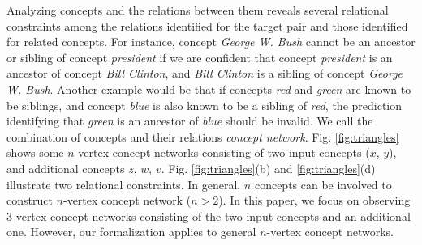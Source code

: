 
Analyzing concepts and the relations between them reveals several
relational constraints among the relations identified for the target
pair and those identified for related concepts. For instance, concept
{\em George W. Bush} cannot be an ancestor or sibling of concept {\em
  president} if we are confident that concept {\em president} is an
ancestor of concept {\em Bill Clinton}, and {\em Bill Clinton} is a
sibling of concept {\em George W. Bush}. Another example would be that
if concepts {\em red} and {\em green} are known to be siblings, and
concept {\em blue} is also known to be a sibling of {\em red}, the
prediction identifying that {\em green} is an ancestor of {\em blue}
should be invalid. We call the combination of concepts and their
relations {\em concept network}. Fig. \ref{fig:triangles} shows some
$n$-vertex concept networks consisting of two input concepts
($x$, $y$), and additional concepts $z$, $w$,
$v$. Fig. \ref{fig:triangles}(b) and \ref{fig:triangles}(d) illustrate
two relational constraints. In general, $n$ concepts can be involved
to construct $n$-vertex concept network ($n > 2$). In this paper, we
focus on observing $3$-vertex concept networks consisting of the two
input concepts and an additional one. However, our formalization
applies to general $n$-vertex concept networks.


